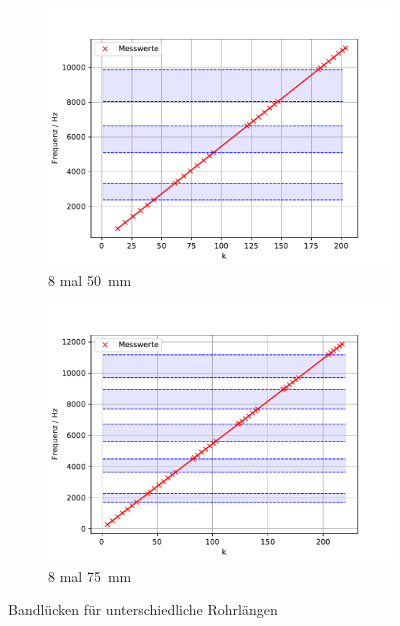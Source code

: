 \begin{figure}
 \centering
 \begin{subfigure}{0.48\textwidth}
  \centering
  \includegraphics[width=1\textwidth]{bla.pdf}
  \caption{8 mal \SI{50}{mm}}
  \label{fig.Aufgabe5}
 \end{subfigure}
 \begin{subfigure}{0.48\textwidth}
  \centering
  \includegraphics[width=1\textwidth]{bla75.pdf}
  \caption{8 mal \SI{75}{mm}}
  \label{fig.Aufgabe575}
 \end{subfigure}
 \caption{Bandlücken für unterschiedliche Rohrlängen}
\end{figure}

